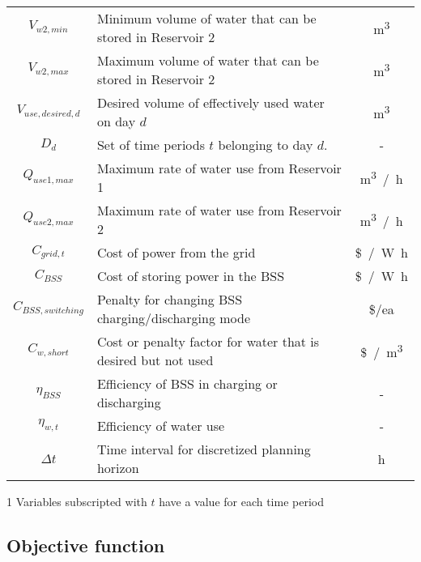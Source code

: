 \begin{table}[htb]
\begin{threeparttable}[b]
\begin{tabular}{cp{}c}
			$V_{w2,min}$ & Minimum volume of water that can be stored in Reservoir 2 & \si{m^3} \\
			$V_{w2,max}$ & Maximum volume of water that can be stored in Reservoir 2 & \si{m^3} \\
			$V_{use,desired,d}$ & Desired volume of effectively used water on day $d$& \si{m^3} \\
			$D_d$ & Set of time periods $t$ belonging to day $d$. & - \\
			$Q_{use1,max}$ & Maximum rate of water use from Reservoir 1 & \si{m^3 / h} \\
			$Q_{use2,max}$ & Maximum rate of water use from Reservoir 2 & \si{m^3 / h} \\
			$C_{grid,t}$ & Cost of power from the grid & \si{\$ / W h} \\
			$C_{BSS}$ & Cost of storing power in the BSS & \si{\$ / W h} \\
			$C_{BSS,switching}$ & Penalty for changing BSS charging/discharging mode & \si{\$/ea} \\
			$C_{w,short}$ & Cost or penalty factor for water that is desired but not used & \si{\$ / m^3} \\
			$\eta_{BSS}$ & Efficiency of BSS in charging or discharging & - \\
			$\eta_{w,t}$ & Efficiency of water use & - \\
			$\Delta t$ & Time interval for discretized planning horizon & \si{h} \\
			\bottomrule
		\end{tabular}
		\begin{tablenotes}
			\footnotesize
			\item [1] Variables subscripted with $t$ have a value for each time period
		\end{tablenotes}
	\end{threeparttable}
\end{table}

\subsection{Objective function}

